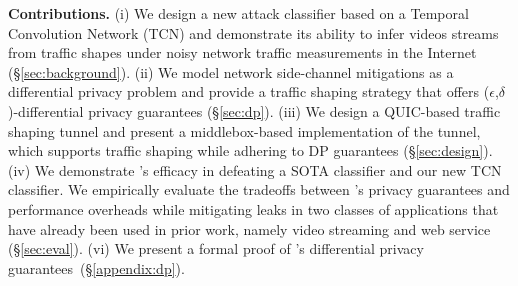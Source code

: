 \textbf{Contributions.}
(i)
We design a new attack classifier based on a
Temporal Convolution Network (TCN) \cite{bai2018tcn}
and demonstrate its ability to infer
videos streams from traffic shapes under noisy network traffic measurements in
the Internet (\S\ref{sec:background}).
(ii) We model network side-channel mitigations as a differential privacy problem
and provide a traffic shaping strategy that offers
($\epsilon$,$\delta$)-differential privacy guarantees (\S\ref{sec:dp}).
(iii) We design a QUIC-based traffic shaping tunnel and present a
middlebox-based implementation of the tunnel, which supports traffic shaping
while adhering to DP guarantees (\S\ref{sec:design}).
(iv) We demonstrate {\sys}'s efficacy in defeating a SOTA classifier
\cite{schuster2017beautyburst} and our new TCN classifier.
We empirically evaluate the tradeoffs between {\sys}'s privacy guarantees
and performance overheads while mitigating {\nsca} leaks in two classes of
applications that have already been used in prior work, namely video streaming
and web service (\S\ref{sec:eval}).
(vi) We present a formal proof of {\sys}'s differential privacy
guarantees~(\S\ref{appendix:dp}).
